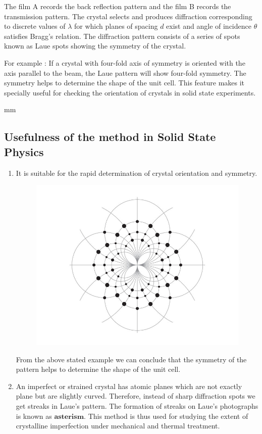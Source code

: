\documentclass[12pt]{article}
\begin{document}
 The film A records the back reflection pattern and the film B records the transmission pattern.
The crystal selects and produces diffraction corresponding to discrete values of $\lambda$ for which planes of spacing ${d}$ exist and angle of incidence $\theta$ satisfies Bragg's relation. The diffraction pattern consists of a series of spots known as Laue spots showing the symmetry of the crystal. 



For example : If a crystal with four-fold axis of symmetry is oriented with the axis parallel to the beam, the Laue pattern will show four-fold symmetry. The symmetry helps to determine the shape of the unit cell. This feature makes it specially useful for checking the orientation of crystals in solid state experiments.

 mm

\subsection{Usefulness of the method in Solid State Physics}
\begin {enumerate}
\item It is suitable for the rapid determination of crystal orientation and symmetry. 
\begin{figure}[h!]
  \centering \includegraphics[width= 14cm] {fourfold.jpg}
\end{figure}

From the above stated example we can conclude that the symmetry of the pattern helps to determine the shape of the unit cell.
\item An imperfect or strained crystal has atomic planes which are not exactly plane but are slightly curved. Therefore, instead of sharp diffraction spots we get streaks in Laue's pattern. The formation of streaks on Laue's photographs is known as $\textbf{asterism}$.
This method is thus used for studying the extent of crystalline imperfection under mechanical and thermal treatment.
\end{enumerate}
\end{document}
